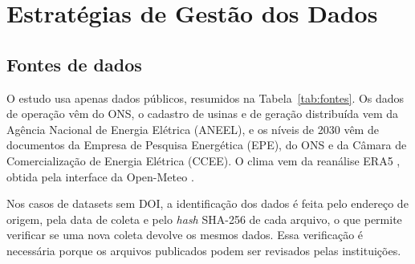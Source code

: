 \section{Estratégias de Gestão dos Dados}
\label{sec:gestao}

\subsection{Fontes de dados}
\label{sec:fontes}

O estudo usa apenas dados públicos, resumidos na Tabela~\ref{tab:fontes}. Os dados de operação vêm do ONS, o cadastro de usinas e de geração distribuída vem da Agência Nacional de Energia Elétrica (ANEEL), e os níveis de 2030 vêm de documentos da Empresa de Pesquisa Energética (EPE), do ONS e da Câmara de Comercialização de Energia Elétrica (CCEE). O clima vem da reanálise ERA5 \parencite{hersbach2020,era5_cds}, obtida pela interface da Open-Meteo \parencite{openmeteo}.

Nos casos de datasets sem DOI, a identificação dos dados é feita pelo endereço de origem, pela data de coleta e pelo \textit{hash} SHA-256 de cada arquivo, o que permite verificar se uma nova coleta devolve os mesmos dados. Essa verificação é necessária porque os arquivos publicados podem ser revisados pelas instituições.

